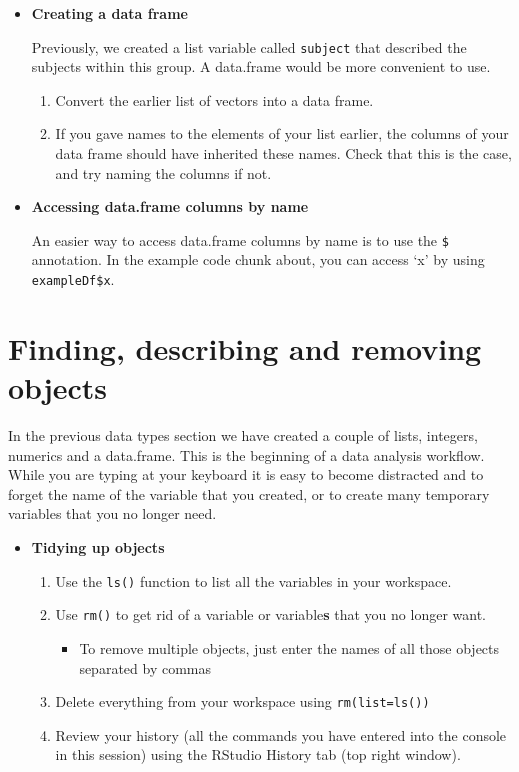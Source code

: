 \documentclass[a4paper]{book}
\providecommand{\tightlist}{%
  \setlength{\itemsep}{0pt}\setlength{\parskip}{0pt}}
\newenvironment{rmdblock}[1]
  {\vspace{1.5em}\begin{shaded*}
  \begin{itemize}
  \renewcommand{\labelitemi}{
    \raisebox{-.7\height}[0pt][0pt]{
      {\setkeys{Gin}{width=3em,keepaspectratio}\texttt{[image: images/\#1]}}
    }
  }
  \item
  }
  {
  \end{itemize}
  \end{shaded*}
  }
\newenvironment{rmdtip}
  {\begin{rmdblock}{tip}}
  {\end{rmdblock}}
\newenvironment{rmdexercise}
  {\begin{rmdblock}{exercise}}
  {\end{rmdblock}}
\begin{document}
\begin{rmdexercise}
\textbf{Creating a data frame}

Previously, we created a list variable called \texttt{subject} that
described the subjects within this group. A data.frame would be more
convenient to use.

\begin{enumerate}
\def\labelenumi{\arabic{enumi}.}
\item
  Convert the earlier list of vectors into a data frame.
\item
  If you gave names to the elements of your list earlier, the columns of
  your data frame should have inherited these names. Check that this is
  the case, and try naming the columns if not.
\end{enumerate}
\end{rmdexercise}

\begin{rmdtip}
\textbf{Accessing data.frame columns by name}

An easier way to access data.frame columns by name is to use the
\texttt{\$} annotation. In the example code chunk about, you can access
`x' by using \texttt{exampleDf\$x}.
\end{rmdtip}

\section{Finding, describing and removing
objects}\label{finding-describing-and-removing-objects}

In the previous data types section we have created a couple of lists,
integers, numerics and a data.frame. This is the beginning of a data
analysis workflow. While you are typing at your keyboard it is easy to
become distracted and to forget the name of the variable that you
created, or to create many temporary variables that you no longer need.

\begin{rmdexercise}
\textbf{Tidying up objects}

\begin{enumerate}
\def\labelenumi{\arabic{enumi}.}
\item
  Use the \texttt{ls()} function to list all the variables in your
  workspace.
\item
  Use \texttt{rm()} to get rid of a variable or variable\textbf{s} that
  you no longer want.

  \begin{itemize}
  \tightlist
  \item
    To remove multiple objects, just enter the names of all those
    objects separated by commas
  \end{itemize}
\item
  Delete everything from your workspace using \texttt{rm(list=ls())}
\item
  Review your history (all the commands you have entered into the
  console in this session) using the RStudio History tab (top right
  window).
\end{enumerate}
\end{rmdexercise}
\end{document}
